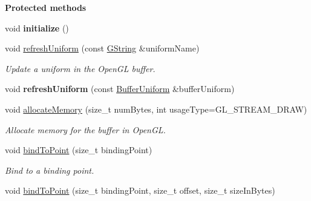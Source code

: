 \begin{Indent}\textbf{ Protected methods}\par
\begin{DoxyCompactItemize}
\item 
\mbox{\label{classrev_1_1_u_b_o_ae670daaa9bae897204ecf1147cb1e8bf}} 
void {\bfseries initialize} ()
\item 
\mbox{\label{classrev_1_1_u_b_o_a048e1fc3bb9e4eaf1ffdf2f496eb56f7}} 
void \mbox{\hyperlink{classrev_1_1_u_b_o_a048e1fc3bb9e4eaf1ffdf2f496eb56f7}{refresh\+Uniform}} (const \mbox{\hyperlink{classrev_1_1_g_string}{G\+String}} \&uniform\+Name)
\begin{DoxyCompactList}\small\item\em Update a uniform in the Open\+GL buffer. \end{DoxyCompactList}\item 
\mbox{\label{classrev_1_1_u_b_o_a239533420e34b09b5a47926c82777320}} 
void {\bfseries refresh\+Uniform} (const \mbox{\hyperlink{structrev_1_1_buffer_uniform}{Buffer\+Uniform}} \&buffer\+Uniform)
\item 
\mbox{\label{classrev_1_1_u_b_o_aa69eee1b04f41837ebb9ff224f7122b5}} 
void \mbox{\hyperlink{classrev_1_1_u_b_o_aa69eee1b04f41837ebb9ff224f7122b5}{allocate\+Memory}} (size\+\_\+t num\+Bytes, int usage\+Type=G\+L\+\_\+\+S\+T\+R\+E\+A\+M\+\_\+\+D\+R\+AW)
\begin{DoxyCompactList}\small\item\em Allocate memory for the buffer in Open\+GL. \end{DoxyCompactList}\item 
\mbox{\label{classrev_1_1_u_b_o_ae7499e5c6988ffb1571ca7dfcca9a8f2}} 
void \mbox{\hyperlink{classrev_1_1_u_b_o_ae7499e5c6988ffb1571ca7dfcca9a8f2}{bind\+To\+Point}} (size\+\_\+t binding\+Point)
\begin{DoxyCompactList}\small\item\em Bind to a binding point. \end{DoxyCompactList}\item 
\mbox{\label{classrev_1_1_u_b_o_a35865bd2decfdf3228a34e004f935e81}} 
void \mbox{\hyperlink{classrev_1_1_u_b_o_a35865bd2decfdf3228a34e004f935e81}{bind\+To\+Point}} (size\+\_\+t binding\+Point, size\+\_\+t offset, size\+\_\+t size\+In\+Bytes)

\end{DoxyCompactItemize}
\end{Indent}
